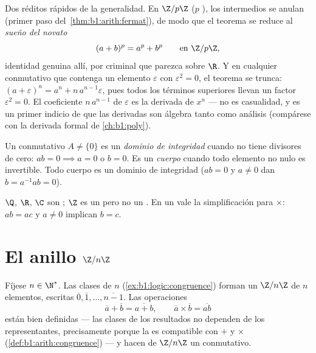 \begin{example}\label{ex:b1:structures:binomialring}
Dos réditos rápidos de la generalidad. En $\Z/p\Z$ ($p$ ), los
 intermedios se anulan (primer paso
del~\cref{thm:b1:arith:fermat}), de modo que el teorema se reduce al
\emph{sueño del novato}
\[
(a + b)^p = a^p + b^p \qquad \text{en } \Z/p\Z ,
\]
identidad genuina allí, por criminal que parezca sobre $\R$. Y en
cualquier  conmutativo que contenga un elemento $\varepsilon$
con $\varepsilon^2 = 0$, el teorema se trunca:
$(a + \varepsilon)^n = a^n + n\,a^{n-1}\varepsilon$, pues todos los
términos superiores llevan un factor $\varepsilon^2 = 0$. El
coeficiente $n\,a^{n-1}$ de $\varepsilon$ es la derivada de $x^n$ ---
no es casualidad, y es un primer indicio de que las derivadas son
álgebra tanto como análisis (compárese con la derivada formal de
\cref{ch:b1:poly}).
\end{example}

\begin{definition}\label{def:b1:structures:field}
Un  conmutativo $A \neq \{0\}$ es un \emph{dominio de
integridad} cuando no tiene divisores de
cero: $ab = 0 \implies a = 0$ o $b = 0$. Es un
\emph{cuerpo} cuando todo elemento no nulo es invertible.
Todo cuerpo es un dominio de integridad ($ab = 0$ y $a \neq 0$ dan
$b = a^{-1}ab = 0$).
\end{definition}

\begin{example}
$\Q$, $\R$, $\C$ son ; $\Z$ es un  pero
no un . En un  vale la simplificación
para $\times$: $ab = ac$ y $a \neq 0$ implican $b = c$.
\end{example}

\section{El anillo $\Z/n\Z$}

\begin{definition}\label{def:b1:structures:zn}
Fíjese $n \in \N^*$. Las clases de   $n$
(\cref{ex:b1:logic:congruence}) forman un 
$\Z/n\Z$ de $n$ elementos, escritas $\overline 0,
\overline 1, \dots, \overline{n-1}$. Las operaciones
\[
\overline a + \overline b = \overline{a + b},
\qquad
\overline a \times \overline b = \overline{ab}
\]
están bien definidas --- las clases de los resultados no dependen de los
representantes, precisamente porque la  es compatible con
$+$ y $\times$ (\cref{def:b1:arith:congruence}) --- y hacen de $\Z/n\Z$
un  conmutativo.
\end{definition}

